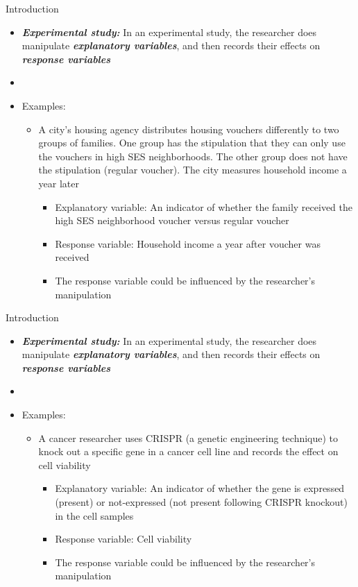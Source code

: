 \documentclass[xcolor=dvipsnames]{beamer}
\begin{document}
\begin{frame}{Introduction}
	\begin{itemize}
		\item \textbf{\emph{Experimental study:}} In an experimental study, the researcher does manipulate \textbf{\emph{explanatory variables}}, and then records their effects on \textbf{\emph{response variables}} \pause
		\item[]
		\item Examples: \pause
		\begin{itemize}
			\item A city's housing agency distributes housing vouchers differently to two groups of families. One group has the stipulation that they can only use the vouchers in high SES neighborhoods. The other group does not have the stipulation (regular voucher). The city measures household income a year later \pause
			\begin{itemize}
				\item Explanatory variable: An indicator of whether the family received the high SES neighborhood voucher versus regular voucher \pause
				\item Response variable: Household income a year after voucher was received \pause
				\item The response variable could be influenced by the researcher's manipulation 
			\end{itemize}
	\end{itemize}
\end{itemize}
\end{frame}

\begin{frame}{Introduction}
\begin{itemize}
	\item \textbf{\emph{Experimental study:}} In an experimental study, the researcher does manipulate  \textbf{\emph{explanatory variables}}, and then records their effects on \textbf{\emph{response variables}} 
	\item[]
	\item Examples: \pause
	\begin{itemize}
		\item A cancer researcher uses CRISPR (a genetic engineering technique) to knock out a specific gene in a cancer cell line and records the effect on cell viability \pause
		\begin{itemize}
			\item Explanatory variable: An indicator of whether the gene is expressed (present) or not-expressed (not present following CRISPR knockout) in the cell samples \pause
			\item Response variable: Cell viability \pause
			\item The response variable could be influenced by the researcher's manipulation 
		\end{itemize}
	\end{itemize}
\end{itemize}
\end{frame}
\end{document}
